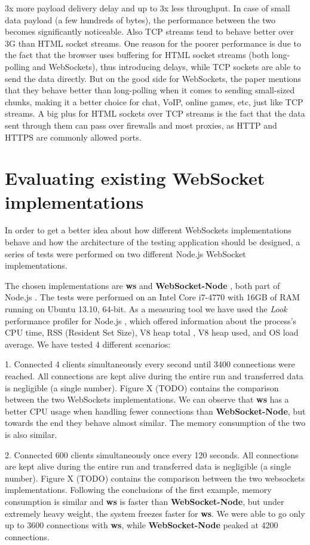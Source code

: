 \documentclass[conference]{IEEEtran}
\begin{document}
3x more payload delivery delay and up to 3x less throughput. In case of small
data payload (a few hundreds of bytes), the performance between the two becomes
significantly noticeable. Also TCP streams tend to behave better over 3G than
HTML socket streams.
One reason for the poorer performance is due to the fact that the browser uses
buffering for HTML socket streams (both long-polling and WebSockets), thus 
introducing delays, while TCP sockets are able to send the data directly.
But on the good side for
WebSockets, the paper mentions that they behave better than long-polling when
it comes to sending small-sized chunks, making it a better choice for chat,
VoIP, online games, etc, just like TCP streams. A big plus for HTML sockets
over TCP streams is the fact that the data sent through them can pass over
firewalls and most proxies, as HTTP and HTTPS are commonly allowed ports.

\section{Evaluating existing WebSocket implementations}
In order to get a better idea about how different WebSockets implementations
behave and how the architecture of the testing application should be designed, a
series of tests were performed on two different Node.js WebSocket implementations.

The chosen implementations are \textbf{ws} \cite{nodejs-ws}
and \textbf{WebSocket-Node} \cite{nodejs-websocket}, both part of Node.js
\cite{nodejs}. The tests were performed on an Intel Core i7-4770 with 16GB of
RAM running on Ubuntu 13.10, 64-bit. As a measuring tool we have used the
\textit{Look} performance profiler for Node.js \cite{nodejs-look}, which offered
information about the process's CPU time, RSS (Resident Set Size), V8 heap total
\cite{javascript-v8}, V8 heap used, and OS load average.
\indent
We have tested 4 different scenarios:

1. Connected 4 clients simultaneously every second until 3400 connections were reached.
All connections are kept alive during the entire run and transferred data is negligible
(a single number). Figure X (TODO) contains the comparison between the two WebSockets
implementations. We can observe that \textbf{ws} has a better CPU usage when handling
fewer connections than \textbf{WebSocket-Node}, but towards the end they behave almost
similar. The memory consumption of the two is also similar.

2. Connected 600 clients simultaneously once every 120 seconds. All connections are
kept alive during the entire run and transferred data is negligible (a single number).
Figure X (TODO) contains the comparison between the two websockets implementations.
Following the conclusions of the first example, memory consumption is similar and
\textbf{ws} is faster than \textbf{WebSocket-Node}, but under extremely heavy weight,
the system freezes faster for \textbf{ws}. We were able to go only up to 3600 connections
with \textbf{ws}, while \textbf{WebSocket-Node} peaked at 4200 connections.
\end{document}
